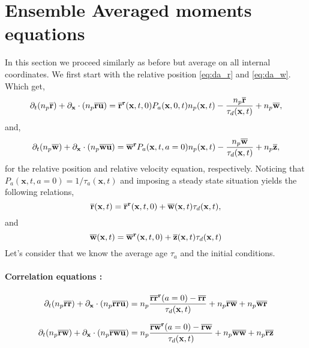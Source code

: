 \section{Ensemble Averaged moments equations}

In this section we proceed similarly as before but average on all internal coordinates. 
We first start with the relative position \ref{eq:da_r} and \ref{eq:da_w}. 
Which get,
\begin{equation}
    \partial_t (n_p\overline{\textbf{r}})
    + \partial_{\textbf{x}} \cdot (n_p\overline{\textbf{r}\textbf{u}})
    =  
    \overline{\textbf{r}}^{\textbf{r}}(\textbf{x},t,0)P_a(\textbf{x},0,t)n_p(\textbf{x},t)
    - \frac{n_p\overline{\textbf{r}}}{\tau_d(\textbf{x},t)}
    + n_p\overline{\textbf{w}},
    \label{eq:dt_avg_r}
\end{equation}
and, 
\begin{equation}
    \partial_t (n_p\overline{\textbf{w}})
    + \partial_{\textbf{x}} \cdot (n_p\overline{\textbf{w}\textbf{u} })
    =  
    \overline{\textbf{w}}^{\textbf{r}} P_a(\textbf{x},t,a=0)n_p(\textbf{x},t)
    - \frac{n_p\overline{\textbf{w}}}{\tau_d(\textbf{x},t)}
    + n_p\overline{\textbf{z}},
\end{equation}
for the relative position and relative velocity equation, respectively. 
Noticing that  $P_a(\textbf{x},t,a=0) = 1/\tau_a(\textbf{x},t)$ and imposing a steady state situation yields the following relations, 
\begin{equation}
    \overline{\textbf{r}} (\textbf{x},t)
    = \overline{\textbf{r}}^{\textbf{r}}(\textbf{x},t,0)
    + \overline{\textbf{w}}(\textbf{x},t)\tau_d(\textbf{x},t),
\end{equation}
and
\begin{equation}
    \overline{\textbf{w}} (\textbf{x},t)
    = \overline{\textbf{w}}^{\textbf{r}}(\textbf{x},t,0)
    + \overline{\textbf{z}}(\textbf{x},t)\tau_d(\textbf{x},t)
\end{equation}
Let's consider that we know the average age $\tau_a$ and the initial conditions. 

\paragraph{Correlation equations :}

\begin{equation}
    \partial_t (n_p\overline{\textbf{rr}} )
    + \partial_{\textbf{x}} \cdot (n_p\overline{\textbf{rr}\textbf{u} })
    =    
    n_p\frac{\overline{\textbf{rr}}^{\textbf{r}}(a=0)
    - \overline{\textbf{rr}} }{\tau_d(\textbf{x},t)}
    + n_p\overline{\textbf{rw}}
    + n_p\overline{\textbf{wr}}
\end{equation}

\begin{equation}
    \partial_t (n_p\overline{\textbf{rw}} )
    + \partial_{\textbf{x}} \cdot (n_p\overline{\textbf{rw}\textbf{u}} )
    =  
    n_p 
    \frac{\overline{\textbf{rw}}^{\textbf{r}}(a=0)
    -\overline{\textbf{rw}} }{\tau_d(\textbf{x},t)}
    + n_p\overline{\textbf{ww}}
    + n_p\overline{\textbf{rz}}
\end{equation}
